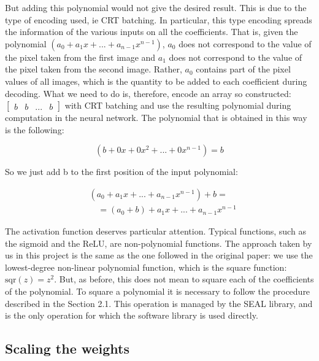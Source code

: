 But adding this polynomial would not give the desired result. This is due to the type of encoding used, ie CRT batching. In particular, this type encoding spreads the information of the various inputs on all the coefficients. That is, given the polynomial $(a_0 + a_1x + ... + a_{n-1}x^{n-1})$, $a_0$ does not correspond to the value of the pixel taken from the first image and $a_1$ does not correspond to the value of the pixel taken from the second image. Rather, $a_0$ contains part of the pixel values of all images, which is the quantity to be added to each coefficient during decoding. What we need to do is, therefore, encode an array so constructed: $\left[ \begin{matrix}b&b&...&b\end{matrix} \right]$ with CRT batching and use the resulting polynomial during computation in the neural network. The polynomial that is obtained in this way is the following:

\begin{equation*}
    (b+0x+0x^2+...+0x^{n-1})=b
\end{equation*}

So we just add b to the first position of the input polynomial:

\begin{align*}
    &(a_0+a_1x+...+a_{n-1}x^{n-1})+b =\\
    &\quad = (a_0+b)+a_1x+...+a_{n-1}x^{n-1}
\end{align*}

The activation function deserves particular attention. Typical functions, such as the sigmoid and the ReLU, are non-polynomial functions. The approach taken by us in this project is the same as the one followed in the original paper: we use the lowest-degree non-linear polynomial function, which is the square function: $\text{sqr}(z)=z^2$. But, as before, this does not mean to square each of the coefficients of the polynomial. To square a polynomial it is necessary to follow the procedure described in the Section 2.1. This operation is managed by the SEAL library, and is the only operation for which the software library is used directly.

\subsection{Scaling the weights}

